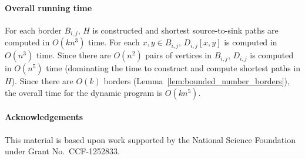 \documentclass[11pt,twoside]{article}
\newcommand{\border}[2]{B_{#1,#2}}
\begin{document}
\paragraph{Overall running time}  For each border $\border{i}{j}$, $H$ is constructed and shortest source-to-sink paths are computed in $O(k n^3)$ time.  For each $x,y \in \border{i}{j}$, $D_{i,j}[x,y]$ is computed in $O(n^3)$ time.  Since there are $O(n^2)$ pairs of vertices in $\border{i}{j}$, $D_{i,j}$ is computed in $O(n^5)$ time (dominating the time to construct and compute shortest paths in $H$).  Since there are $O(k)$ borders (Lemma~\ref{lem:bounded_number_borders}),  the overall time for the dynamic program is $O(kn^5)$.




\paragraph{Acknowledgements}  This material is based upon work supported by the National Science Foundation under Grant No.\ CCF-1252833.




\end{document}
